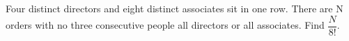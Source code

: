 Four distinct directors and eight distinct associates sit in one row. There are N orders with no three consecutive people all directors or all associates. Find $\dfrac{N}{8!}$.
